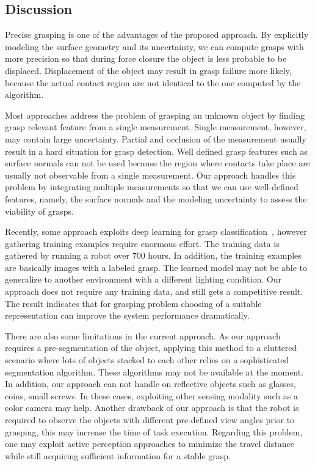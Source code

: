 \subsection{Discussion} 
Precise grasping is one of the advantages of the proposed approach. By explicitly modeling the surface geometry and its uncertainty, we can compute grasps with more precision so that during force closure the object is less probable to be displaced. Displacement of the object may result in grasp failure more likely, because the actual contact region are not identical to the one computed by the algorithm. 

Most approaches address the problem of grasping an unknown object by finding grasp relevant feature from a single measurement. Single measurement, however, may contain large uncertainty. Partial and occlusion of the measurement usually result in a hard situation for grasp detection. Well defined grasp features such as surface normals can not be used because the region where contacts take place are usually not observable from a single measurement. Our approach handles this problem by integrating multiple measurements so that we can use well-defined features, namely, the surface normals and the modeling uncertainty to assess the viability of grasps. 

Recently, some approach exploits deep learning for grasp classification~\cite{Pinto2015}, however gathering training examples require enormous effort. The training data is gathered by running a robot over 700 hours. In addition, the training examples are basically images with a labeled grasp. The learned model may not be able to generalize to another environment with a different lighting condition. Our approach does not require any training data, and still gets a competitive result. The result indicates that for grasping problem  choosing of a suitable representation can improve the system performance dramatically. 

There are also some limitations in the current approach. As our approach requires a pre-segmentation of the  object, applying this  method to a cluttered scenario where lots of objects stacked to each other relies on a sophisticated segmentation algorithm. These algorithms may not be available at the moment. In addition, our approach can not handle on reflective objects such as glasses, coins, small screws. In these cases, exploiting other sensing modality such as a color camera may help. Another drawback of our approach is that the robot is required to observe the objects with different pre-defined view angles prior to grasping, this may increase the time of task execution. Regarding this problem, one may exploit active perception approaches to minimize the travel distance while still acquiring sufficient information for a stable grasp. 

